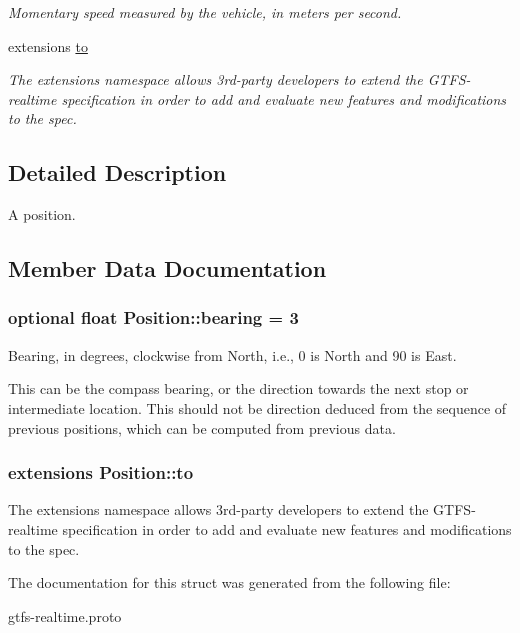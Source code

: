 \begin{DoxyCompactItemize}
\begin{DoxyCompactList}\small\item\em Momentary speed measured by the vehicle, in meters per second. \end{DoxyCompactList}\item 
extensions \hyperlink{structPosition_a1399a54f196aed8449420c26acbbf123}{to}
\begin{DoxyCompactList}\small\item\em The extensions namespace allows 3rd-\/party developers to extend the G\+T\+F\+S-\/realtime specification in order to add and evaluate new features and modifications to the spec. \end{DoxyCompactList}\end{DoxyCompactItemize}


\subsection{Detailed Description}
A position. 

\subsection{Member Data Documentation}
\subsubsection[{\texorpdfstring{bearing}{bearing}}]{\setlength{\rightskip}{0pt plus 5cm}optional float Position\+::bearing = 3}\hypertarget{structPosition_add80884715080cf7a0f070820f9ca5a0}{}\label{structPosition_add80884715080cf7a0f070820f9ca5a0}


Bearing, in degrees, clockwise from North, i.\+e., 0 is North and 90 is East. 

This can be the compass bearing, or the direction towards the next stop or intermediate location. This should not be direction deduced from the sequence of previous positions, which can be computed from previous data. 
\subsubsection[{\texorpdfstring{to}{to}}]{\setlength{\rightskip}{0pt plus 5cm}extensions Position\+::to}\hypertarget{structPosition_a1399a54f196aed8449420c26acbbf123}{}\label{structPosition_a1399a54f196aed8449420c26acbbf123}


The extensions namespace allows 3rd-\/party developers to extend the G\+T\+F\+S-\/realtime specification in order to add and evaluate new features and modifications to the spec. 



The documentation for this struct was generated from the following file\+:\begin{DoxyCompactItemize}
\item 
gtfs-\/realtime.\+proto\end{DoxyCompactItemize}
